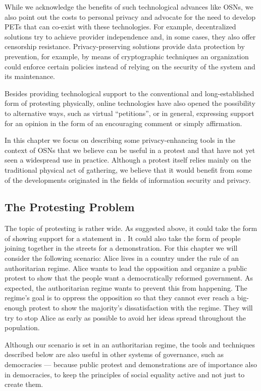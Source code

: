 While we acknowledge the benefits of such technological advances like
\acp{OSN}, we also point out the costs to personal privacy and
advocate for the need to develop \acp{PET} that
can co-exist with these technologies. For example, decentralized
solutions try to achieve provider independence and, in some cases,
they also offer censorship resistance. Privacy-preserving solutions
provide data protection by prevention, for example, by means of
cryptographic techniques an organization could enforce certain
policies instead of relying on the security of the system and its
maintenance.

Besides providing technological support to the conventional and
long-established form of protesting physically, online technologies
have also opened the possibility to alternative ways, such as virtual
\enquote{petitions}, or in general, expressing support for an opinion
in the form of an encouraging comment or simply affirmation.

In this chapter we focus on describing some privacy-enhancing tools in
the context of \acp{OSN} that we believe can be useful in a protest
and that have not yet seen a widespread use in practice. Although a
protest itself relies mainly on the traditional physical act of
gathering, we believe that it would benefit from some of the
developments originated in the fields of information security and
privacy.

\subsection{The Protesting Problem}

The topic of protesting is rather wide.
As suggested above, it could take the form of showing support for a statement 
in .
It could also take the form of people joining together in the streets for 
a demonstration.
For this chapter we will consider the following scenario:
Alice lives in a country under the rule of an authoritarian regime.
Alice wants to lead the opposition and organize a public protest to show that 
the people want a democratically reformed government.
As expected, the authoritarian regime wants to prevent this from happening.
The regime's goal is to oppress the opposition so that they cannot ever reach 
a big-enough protest to show the majority's dissatisfaction with the regime.
They will try to stop Alice as early as possible to avoid her ideas spread 
throughout the population.

Although our scenario is set in an authoritarian regime, the tools and 
techniques described below are also useful in other systems of governance, such 
as democracies --- because public 
protest and demonstrations are of importance also in democracies, to keep the 
principles of social equality active and not just to create them.

